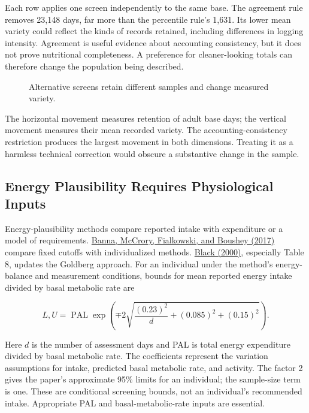 Each row applies one screen independently to the same base. The
agreement rule removes 23,148 days, far more than the percentile rule's
1,631. Its lower mean variety could reflect the kinds of records
retained, including differences in logging intensity. Agreement is
useful evidence about accounting consistency, but it does not prove
nutritional completeness. A preference for cleaner-looking totals can
therefore change the population being described.

\begin{figure}[htbp]
\centering

\caption{Alternative screens retain different samples and change measured variety.}\label{fig:M02_mhealth_screening}
\end{figure}

The horizontal movement measures retention of adult base days; the
vertical movement measures their mean recorded variety. The
accounting-consistency restriction produces the largest movement in both
dimensions. Treating it as a harmless technical correction would obscure
a substantive change in the sample.

\hypertarget{M02-energy-plausibility-requires-physiological-inputs}{%
\subsection{Energy Plausibility Requires Physiological
Inputs}\label{M02-energy-plausibility-requires-physiological-inputs}}

\noindent Energy-plausibility methods compare reported intake with expenditure or
a model of requirements.
\href{https://doi.org/10.3389/fnut.2017.00045}{Banna, McCrory,
Fialkowski, and Boushey (2017)} compare fixed cutoffs with
individualized methods.
\href{https://doi.org/10.1038/sj.ijo.0801376}{Black (2000)}, especially
Table 8, updates the Goldberg approach. For an individual under the
method's energy-balance and measurement conditions, bounds for mean
reported energy intake divided by basal metabolic rate are

\[
L,U=\operatorname{PAL}\exp\left(\mp 2\sqrt{\frac{(0.23)^2}{d}+(0.085)^2+(0.15)^2}\right).
\]

Here \(d\) is the number of assessment days and PAL is total energy
expenditure divided by basal metabolic rate. The coefficients represent
the variation assumptions for intake, predicted basal metabolic rate,
and activity. The factor 2 gives the paper's approximate 95\% limits for
an individual; the sample-size term is one. These are conditional
screening bounds, not an individual's recommended intake. Appropriate
PAL and basal-metabolic-rate inputs are essential.

